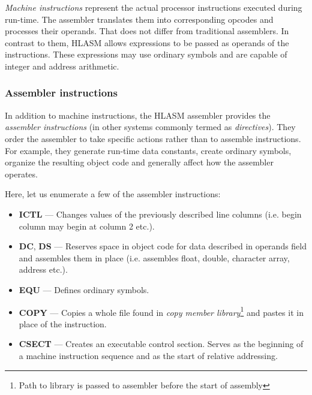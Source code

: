 \emph{Machine instructions} represent the actual processor instructions executed during run-time. The assembler translates them into corresponding opcodes and processes their operands. That does not differ from traditional assemblers. In contrast to them, HLASM allows expressions to be passed as operands of the instructions. These expressions may use ordinary symbols and are capable of integer and address arithmetic.

\subsubsection{Assembler instructions}
\label{asm_instrs}

In addition to machine instructions, the HLASM assembler provides the \emph{assembler instructions} (in other systems commonly termed as \emph{directives}). They order the assembler to take specific actions rather than to assemble instructions. For example, they generate run-time data constants, create ordinary symbols, organize the resulting object code and generally affect how the assembler operates.

Here, let us enumerate a few of the assembler instructions:
\begin{itemize}
	\item \textbf{ICTL} --- Changes values of the previously described line columns (i.e. begin column may begin at column 2 etc.).
	
	\item \textbf{DC}, \textbf{DS} --- Reserves space in object code for data described in operands field and assembles them in place (i.e. assembles float, double, character array, address etc.).
	
	\item \textbf{EQU} --- Defines ordinary symbols.
	
	\item \textbf{COPY} --- Copies a whole file found in \emph{copy member library}\footnote{Path to library is passed to assembler before the start of assembly} and pastes it in place of the instruction.
	
	\item \textbf{CSECT} --- Creates an executable control section. Serves as the beginning of a machine instruction sequence and as the start of relative addressing.
\end{itemize}

\vspace{5mm}

